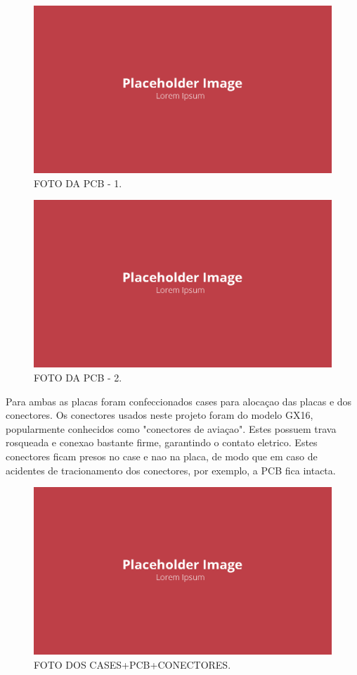 \begin{figure}[!ht]
    \centering
    \includegraphics[width=.8\linewidth]{figuras/placeholder.png}
    \caption{FOTO DA PCB - 1\cite{autor}.}
    \label{fig:placeholder}
\end{figure}

\begin{figure}[!ht]
    \centering
    \includegraphics[width=.8\linewidth]{figuras/placeholder.png}
    \caption{FOTO DA PCB - 2\cite{autor}.}
    \label{fig:placeholder}
\end{figure}

Para ambas as placas foram confeccionados cases para alocaçao das placas e dos conectores. Os conectores usados neste projeto foram do modelo GX16, popularmente conhecidos como "conectores de aviaçao". Estes possuem trava rosqueada e conexao bastante firme, garantindo o contato eletrico. Estes conectores ficam presos no case e nao na placa, de modo que em caso de acidentes de tracionamento dos conectores, por exemplo, a PCB fica intacta.

\begin{figure}[!ht]
    \centering
    \includegraphics[width=.8\linewidth]{figuras/placeholder.png}
    \caption{FOTO DOS CASES+PCB+CONECTORES\cite{autor}.}
    \label{fig:placeholder}
\end{figure}

